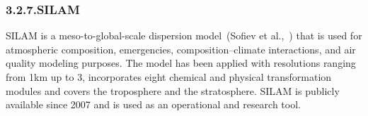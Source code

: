 \documentclass[9pt]{report}
\begin{document}
\begin{table}[h!]%
\begin{mdcenter}%
{}%
\end{mdcenter}\label{mocage-portfolio}%
\end{table}%

\subsubsection{3.2.7.\hspace*{0.5em}SILAM}\label{sec-silam}%

\noindent{}SILAM is a meso-to-global-scale dispersion model~(Sofiev et al.,~) that is used for atmospheric composition, emergencies, composition–climate interactions, and air quality modeling purposes. 
The model has been applied with resolutions ranging from 1km up to 3\textdegree{}, incorporates eight chemical and physical transformation modules and covers the troposphere and the stratosphere. 
SILAM is publicly available since 2007 and is used as an operational and research tool.%
\end{document}
